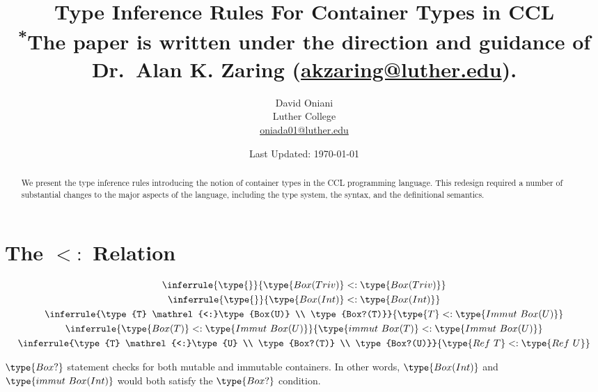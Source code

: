 \documentclass{article}
\author{David Oniani\\
        Luther College\\
        \href{mailto:oniada01@luther.edu}{oniada01@luther.edu}}
\title{\textbf{Type Inference Rules For Container Types in CCL}\\
       \medskip
       \small \textsuperscript{*}The paper is written under the direction and
       guidance of Dr.\ Alan K. Zaring
       (\href{mailto:akzaring@luther.edu}{akzaring@luther.edu}).}
\date{Last Updated: \today}
\newcommand\subtype{\mathrel{<:}}
\begin{document}
\maketitle


\begin{abstract}
\noindent We present the type inference rules introducing the notion of
container types in the CCL programming language. This redesign required a
number of substantial changes to the major aspects of the language, including
the type system, the syntax, and the definitional semantics.
\end{abstract}


\section*{The $\subtype$ Relation}

\begin{gather}
  \inferrule{\type{}}{\type{Box(Triv)} \subtype \type{Box(Triv)}}\\
  \inferrule{\type{}}{\type{Box(Int)} \subtype \type{Box(Int)}}\\
  \inferrule{\type{T} \subtype \type{Box(U)} \\ \type{Box?(T)}}{\type{T} \subtype \type{Immut\ Box(U)}}\\
  \inferrule{\type{Box(T)} \subtype \type{Immut\ Box(U)}}{\type{immut\ Box(T)} \subtype \type{Immut\ Box(U)}}\\
  \inferrule{\type{T} \subtype \type{U} \\ \type{Box?(T)} \\ \type{Box?(U)}}{\type{Ref\ T} \subtype \type{Ref\ U}}
\end{gather}

$\type{Box?}$ statement checks for both mutable and immutable containers.
In other words, $\type{Box(Int)}$ and $\type{immut\ Box(Int)}$ would both
satisfy the $\type{Box?}$ condition.

\end{document}
